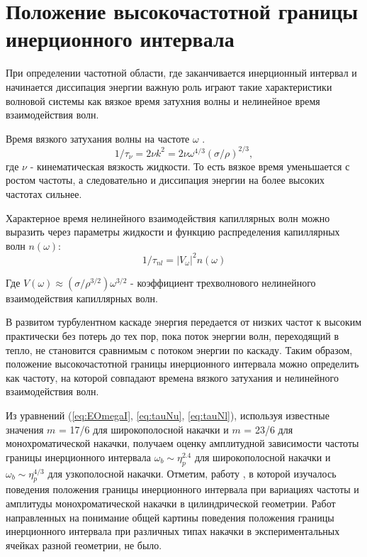 \section{Положение высокочастотной границы инерционного интервала}%

При определении частотной области, где заканчивается инерционный интервал и начинается диссипация энергии важную роль играют такие характеристики волновой системы как вязкое время затухния волны и нелинейное время взаимодействия волн.

Время вязкого затухания волны на частоте $\omega$ \cite[стр. 135]{land}.
\begin{equation}
\label{eq:tauNu}
1/\tau_\nu = 2\nu k^2 = 2 \nu \omega^{4/3}(\sigma/\rho)^{2/3},
\end{equation}
где $\nu$ - кинематическая вязкость жидкости.
То есть вязкое время уменьшается с ростом частоты, а следовательно и диссипация энергии на более высоких частотах сильнее.


Характерное время нелинейного взаимодействия капиллярных волн можно выразить через параметры жидкости и функцию распределения капиллярных волн $n(\omega)$:
\begin{equation}
\label{eq:tauNl}
1/\tau_{nl} = |V_\omega|^2 n(\omega)
\end{equation}

Где $V(\omega) \approx (\sigma/\rho^{3/2})\omega^{3/2}$ - коэффициент трехволнового нелинейного взаимодействия капиллярных волн.

В развитом турбулентном каскаде энергия передается от низких частот к высоким практически без потерь до тех пор, пока поток энергии волн, переходящий в тепло, не становится сравнимым с потоком энергии по каскаду. Таким образом, положение высокочастотной границы инерционного интервала можно определить как частоту, на которой совпадают времена вязкого затухания и нелинейного взаимодействия волн.

Из уравнений (\ref{eq:EOmegaI}, \ref{eq:tauNu}, \ref{eq:tauNl}), используя известные значения $m$ = 17/6 для широкополосной накачки и $m$ = 23/6 для монохроматической накачки, получаем оценку амплитудной зависимости частоты границы инерционного интервала $\omega_b \sim \eta_p^{2.4}$ для широкополосной накачки и $\omega_b \sim \eta_p^{4/3}$ для узкополосной накачки. Отметим, работу \cite{Brazhnikov_bound_freq}, в которой изучалось поведения положения границы инерционного интервала при вариациях частоты и амплитуды монохроматической накачки в цилиндрической геометрии. Работ направленных на понимание общей картины поведения положения границы инерционного интервала при различных типах накачки в  экспериментальных  ячейках разной геометрии, не было.

